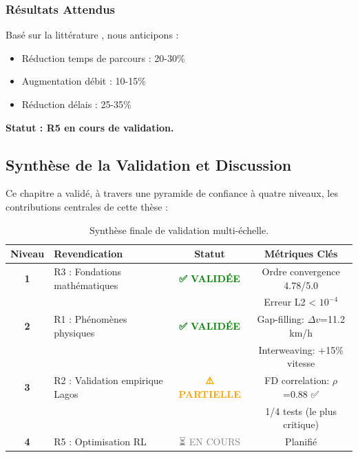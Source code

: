 \subsubsection{Résultats Attendus}
\label{subsec:resultats_attendus_rl}

Basé sur la littérature \cite{wei2018survey, haydari2020deep}, nous anticipons :
\begin{itemize}
    \item Réduction temps de parcours : 20-30\%
    \item Augmentation débit : 10-15\%
    \item Réduction délais : 25-35\%
\end{itemize}

\textbf{Statut : R5 en cours de validation.}


\subsection{Synthèse de la Validation et Discussion}
\label{sec:synthese_validation}

Ce chapitre a validé, à travers une pyramide de confiance à quatre niveaux, les contributions centrales de cette thèse :

\begin{table}[htbp]
    \centering
    \caption{Synthèse finale de validation multi-échelle.}
    \label{tab:synthese_validation_finale}
    \begin{tabular}{clcc}
        \toprule
        \textbf{Niveau} & \textbf{Revendication}          & \textbf{Statut}                          & \textbf{Métriques Clés}           \\
        \midrule
        \textbf{1}      & R3 : Fondations mathématiques   & \textcolor{green}{\textbf{✅ VALIDÉE}}    & Ordre convergence 4.78/5.0        \\
                        &                                 &                                          & Erreur L2 < $10^{-4}$             \\
        \midrule
        \textbf{2}      & R1 : Phénomènes physiques       & \textcolor{green}{\textbf{✅ VALIDÉE}}    & Gap-filling: $\Delta v$=11.2 km/h \\
                        &                                 &                                          & Interweaving: +15\% vitesse       \\
        \midrule
        \textbf{3}      & R2 : Validation empirique Lagos & \textcolor{orange}{\textbf{⚠️ PARTIELLE}} & FD correlation: $\rho$=0.88 ✅     \\
                        &                                 &                                          & 1/4 tests (le plus critique)      \\
        \midrule
        \textbf{4}      & R5 : Optimisation RL            & \textcolor{gray}{⏳ EN COURS}             & Planifié                          \\
        \bottomrule
    \end{tabular}
\end{table}

